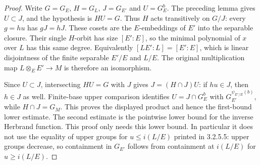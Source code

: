 \begin{proof}
Write $G=G_E$, $H=G_L$, $J=G_{E'}$ and $U=G_E^b$.
The preceding lemma gives $U\subset J$, and the hypothesis is $HU=G$.
Thus $H$ acts transitively on $G/J$: every $g=hu$ has $gJ=hJ$.
These cosets are the $E$-embeddings of $E'$ into the separable closure.
Their single $H$-orbit has size $[E':E]$, so the minimal polynomial
of $x$ over $L$ has this same degree. Equivalently
$[LE':L]=[E':E]$, which is linear disjointness of the finite separable
$E'/E$ and $L/E$. The original multiplication map
$L\otimes_E E'\to M$ is therefore an isomorphism.

Since $U\subset J$, intersecting $HU=G$ with $J$ gives
$J=(H\cap J)U$: if $hu\in J$, then $h\in J$ as well.
Finite-base upper comparison identifies
$U=J\cap G_E^b$ with $G_{E'}^{\psi_{E'/E}(b)}$, while
$H\cap J=G_M$. This proves the displayed product and hence the
first-bound lower estimate. The second estimate is the pointwise
lower bound for the inverse Herbrand function.
This proof only needs this lower bound. In particular it does not
use the equality of upper groups for $u\leq i(L/E)$ printed in
3.2.5.5: upper groups decrease, so containment in $G_{E'}$ follows
from containment at $i(L/E)$ for $u\geq i(L/E)$.
\end{proof}

